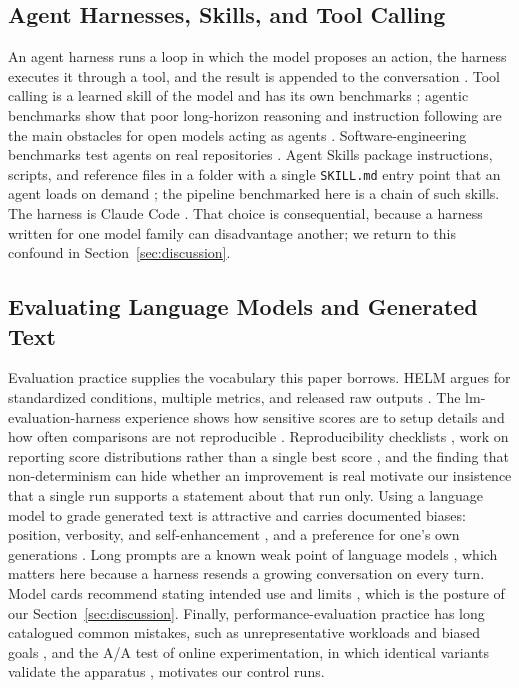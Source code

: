 \documentclass[11pt]{article}
\begin{document}
\subsection{Agent Harnesses, Skills, and Tool Calling}

An agent harness runs a loop in which the model proposes an action, the harness executes it through a tool, and the result is appended to the conversation \cite{yao2023react, anthropic2024agents}. Tool calling is a learned skill of the model and has its own benchmarks \cite{patil2023gorilla, patil2025bfcl}; agentic benchmarks show that poor long-horizon reasoning and instruction following are the main obstacles for open models acting as agents \cite{liu2023agentbench}. Software-engineering benchmarks test agents on real repositories \cite{jimenez2024swebench}. Agent Skills package instructions, scripts, and reference files in a folder with a single \texttt{SKILL.md} entry point that an agent loads on demand \cite{anthropic2025skills}; the pipeline benchmarked here is a chain of such skills. The harness is Claude Code \cite{claudecode}. That choice is consequential, because a harness written for one model family can disadvantage another; we return to this confound in Section~\ref{sec:discussion}.

\subsection{Evaluating Language Models and Generated Text}

Evaluation practice supplies the vocabulary this paper borrows. HELM argues for standardized conditions, multiple metrics, and released raw outputs \cite{liang2022helm}. The lm-evaluation-harness experience shows how sensitive scores are to setup details and how often comparisons are not reproducible \cite{biderman2024lessons}. Reproducibility checklists \cite{pineau2021reproducibility}, work on reporting score distributions rather than a single best score \cite{dodge2019show}, and the finding that non-determinism can hide whether an improvement is real \cite{henderson2018rl} motivate our insistence that a single run supports a statement about that run only. Using a language model to grade generated text is attractive and carries documented biases: position, verbosity, and self-enhancement \cite{zheng2023judge}, and a preference for one's own generations \cite{panickssery2024selfpref}. Long prompts are a known weak point of language models \cite{liu2024lost, hsieh2024ruler}, which matters here because a harness resends a growing conversation on every turn. Model cards recommend stating intended use and limits \cite{mitchell2019modelcards}, which is the posture of our Section~\ref{sec:discussion}. Finally, performance-evaluation practice has long catalogued common mistakes, such as unrepresentative workloads and biased goals \cite{jain1991art}, and the A/A test of online experimentation, in which identical variants validate the apparatus \cite{kohavi2020trustworthy}, motivates our control runs.
\end{document}
